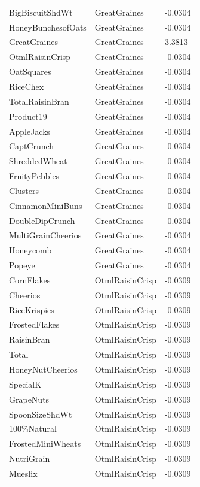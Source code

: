 \begin{table}[!htbp]
\begin{tabular}{lll}
BigBiscuitShdWt & GreatGraines & -0.0304
\\
HoneyBunchesofOats & GreatGraines & -0.0304
\\
GreatGraines & GreatGraines & 3.3813
\\
OtmlRaisinCrisp & GreatGraines & -0.0304
\\
OatSquares & GreatGraines & -0.0304
\\
RiceChex & GreatGraines & -0.0304
\\
TotalRaisinBran & GreatGraines & -0.0304
\\
Product19 & GreatGraines & -0.0304
\\
AppleJacks & GreatGraines & -0.0304
\\
CaptCrunch & GreatGraines & -0.0304
\\
ShreddedWheat & GreatGraines & -0.0304
\\
FruityPebbles & GreatGraines & -0.0304
\\
Clusters & GreatGraines & -0.0304
\\
CinnamonMiniBuns & GreatGraines & -0.0304
\\
DoubleDipCrunch & GreatGraines & -0.0304
\\
MultiGrainCheerios & GreatGraines & -0.0304
\\
Honeycomb & GreatGraines & -0.0304
\\
Popeye & GreatGraines & -0.0304
\\
CornFlakes & OtmlRaisinCrisp & -0.0309
\\
Cheerios & OtmlRaisinCrisp & -0.0309
\\
RiceKrispies & OtmlRaisinCrisp & -0.0309
\\
FrostedFlakes & OtmlRaisinCrisp & -0.0309
\\
RaisinBran & OtmlRaisinCrisp & -0.0309
\\
Total & OtmlRaisinCrisp & -0.0309
\\
HoneyNutCheerios & OtmlRaisinCrisp & -0.0309
\\
SpecialK & OtmlRaisinCrisp & -0.0309
\\
GrapeNuts & OtmlRaisinCrisp & -0.0309
\\
SpoonSizeShdWt & OtmlRaisinCrisp & -0.0309
\\
100\%Natural & OtmlRaisinCrisp & -0.0309
\\
FrostedMiniWheats & OtmlRaisinCrisp & -0.0309
\\
NutriGrain & OtmlRaisinCrisp & -0.0309
\\
Mueslix & OtmlRaisinCrisp & -0.0309
\\

\end{tabular}
\end{table}
